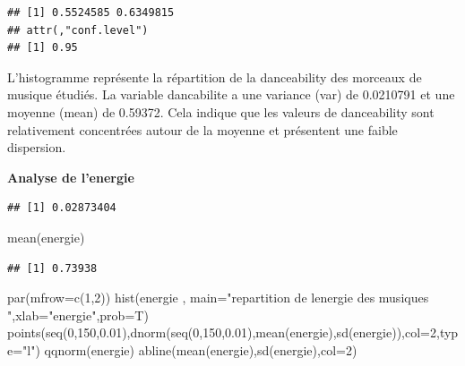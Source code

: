 \documentclass[
]{article}
\newenvironment{Shaded}{\begin{snugshade}}{\end{snugshade}}
\newcommand{\AttributeTok}[1]{\textcolor[rgb]{0.77,0.63,0.00}{#1}}
\newcommand{\DecValTok}[1]{\textcolor[rgb]{0.00,0.00,0.81}{#1}}
\newcommand{\FloatTok}[1]{\textcolor[rgb]{0.00,0.00,0.81}{#1}}
\newcommand{\FunctionTok}[1]{\textcolor[rgb]{0.00,0.00,0.00}{#1}}
\newcommand{\NormalTok}[1]{#1}
\newcommand{\OtherTok}[1]{\textcolor[rgb]{0.56,0.35,0.01}{#1}}
\newcommand{\SpecialCharTok}[1]{\textcolor[rgb]{0.00,0.00,0.00}{#1}}
\newcommand{\StringTok}[1]{\textcolor[rgb]{0.31,0.60,0.02}{#1}}
\begin{document}
\begin{verbatim}
## [1] 0.5524585 0.6349815
## attr(,"conf.level")
## [1] 0.95
\end{verbatim}

L'histogramme représente la répartition de la danceability des morceaux
de musique étudiés. La variable dancabilite a une variance (var) de
0.0210791 et une moyenne (mean) de 0.59372. Cela indique que les valeurs
de danceability sont relativement concentrées autour de la moyenne et
présentent une faible dispersion.

\textbf{Analyse de l'energie}

\begin{Shaded}
\end{Shaded}

\begin{verbatim}
## [1] 0.02873404
\end{verbatim}

\begin{Shaded}
\begin{Highlighting}[]
\FunctionTok{mean}\NormalTok{(energie)}
\end{Highlighting}
\end{Shaded}

\begin{verbatim}
## [1] 0.73938
\end{verbatim}

\begin{Shaded}
\begin{Highlighting}[]
\FunctionTok{par}\NormalTok{(}\AttributeTok{mfrow=}\FunctionTok{c}\NormalTok{(}\DecValTok{1}\NormalTok{,}\DecValTok{2}\NormalTok{))}
\FunctionTok{hist}\NormalTok{(energie , }\AttributeTok{main=}\StringTok{"repartition de l\textquotesingle{}energie des musiques "}\NormalTok{,}\AttributeTok{xlab=}\StringTok{"energie"}\NormalTok{,}\AttributeTok{prob=}\NormalTok{T)}
\FunctionTok{points}\NormalTok{(}\FunctionTok{seq}\NormalTok{(}\DecValTok{0}\NormalTok{,}\DecValTok{150}\NormalTok{,}\FloatTok{0.01}\NormalTok{),}\FunctionTok{dnorm}\NormalTok{(}\FunctionTok{seq}\NormalTok{(}\DecValTok{0}\NormalTok{,}\DecValTok{150}\NormalTok{,}\FloatTok{0.01}\NormalTok{),}\FunctionTok{mean}\NormalTok{(energie),}\FunctionTok{sd}\NormalTok{(energie)),}\AttributeTok{col=}\DecValTok{2}\NormalTok{,}\AttributeTok{type=}\StringTok{"l"}\NormalTok{)}
\FunctionTok{qqnorm}\NormalTok{(energie)}
\FunctionTok{abline}\NormalTok{(}\FunctionTok{mean}\NormalTok{(energie),}\FunctionTok{sd}\NormalTok{(energie),}\AttributeTok{col=}\DecValTok{2}\NormalTok{)}
\end{Highlighting}
\end{Shaded}
\end{document}
